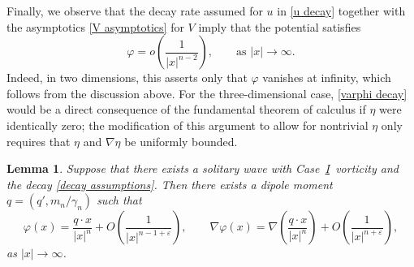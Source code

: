 \documentclass[11pt,reqno]{amsart}
\newcommand{\I}{\texorpdfstring{\hyperref[sec non-singular]{I}}{I}}
\theoremstyle{plain}
\newtheorem{lemma}[theorem]{Lemma}
\theoremstyle{remark}
\numberwithin{equation}{section}
\begin{document}
Finally, we observe that the decay rate assumed for $u$ in \eqref{u decay} together with the asymptotics \eqref{V asymptotics} for $V$ imply that the potential satisfies 
\begin{equation}
  \varphi = o\left( \frac{1}{|x|^{n-2}}\right), \qquad \textrm{as } |x| \to \infty.\label{varphi decay} 
\end{equation}
Indeed, in two dimensions, this asserts only that $\varphi$ vanishes at infinity, which follows from the discussion above.  For the three-dimensional case, \eqref{varphi decay} would be a direct consequence of the fundamental theorem of calculus if $\eta$ were identically zero; the modification of this argument to allow for nontrivial $\eta$ only requires that $\eta$ and $\nabla\eta$ be uniformly bounded.

\begin{lemma} \label{dipole lemma} 
Suppose that there exists a solitary wave with Case~\I\ vorticity
and the decay \eqref{decay assumptions}.
Then there exists a dipole moment $q = (q', m_n/\gamma_n)$ such that 
\begin{equation}
  \varphi(x) = \frac{q \cdot x}{|x|^n} + O\left(\frac{1}{|x|^{n-1+\varepsilon}} \right), \qquad \nabla \varphi(x) = \nabla \left( \frac{q\cdot x}{|x|^n} \right) + O\left(\frac{1}{|x|^{n+\varepsilon}} \right), \label{phi asymptotic} 
\end{equation}
as $|x| \to \infty$.
\end{lemma}
\end{document}
